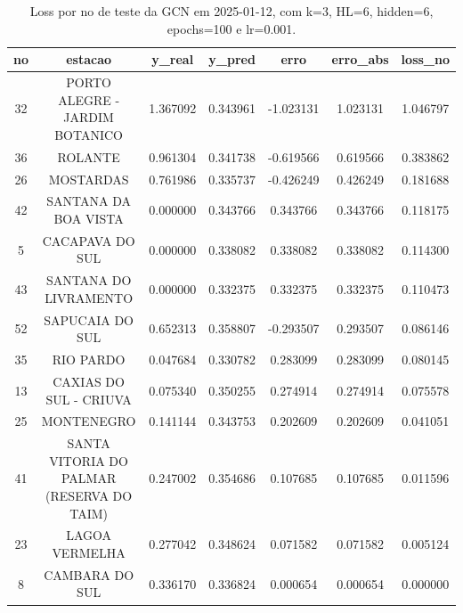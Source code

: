 \begin{table}[h]
\centering
\caption{Loss por no de teste da GCN em 2025-01-12, com k=3, HL=6, hidden=6, epochs=100 e lr=0.001.}
\label{tab:gcn_loss_k3_hl6_h6_e100_d20250112}
\begin{tabular}{ccccccc}
\toprule
no & estacao & y\_real & y\_pred & erro & erro\_abs & loss\_no \\
\midrule
32 & PORTO ALEGRE - JARDIM BOTANICO & 1.367092 & 0.343961 & -1.023131 & 1.023131 & 1.046797 \\
36 & ROLANTE & 0.961304 & 0.341738 & -0.619566 & 0.619566 & 0.383862 \\
26 & MOSTARDAS & 0.761986 & 0.335737 & -0.426249 & 0.426249 & 0.181688 \\
42 & SANTANA DA BOA VISTA & 0.000000 & 0.343766 & 0.343766 & 0.343766 & 0.118175 \\
5 & CACAPAVA DO SUL & 0.000000 & 0.338082 & 0.338082 & 0.338082 & 0.114300 \\
43 & SANTANA DO LIVRAMENTO & 0.000000 & 0.332375 & 0.332375 & 0.332375 & 0.110473 \\
52 & SAPUCAIA DO SUL & 0.652313 & 0.358807 & -0.293507 & 0.293507 & 0.086146 \\
35 & RIO PARDO & 0.047684 & 0.330782 & 0.283099 & 0.283099 & 0.080145 \\
13 & CAXIAS DO SUL - CRIUVA & 0.075340 & 0.350255 & 0.274914 & 0.274914 & 0.075578 \\
25 & MONTENEGRO & 0.141144 & 0.343753 & 0.202609 & 0.202609 & 0.041051 \\
41 & SANTA VITORIA DO PALMAR (RESERVA DO TAIM) & 0.247002 & 0.354686 & 0.107685 & 0.107685 & 0.011596 \\
23 & LAGOA VERMELHA & 0.277042 & 0.348624 & 0.071582 & 0.071582 & 0.005124 \\
8 & CAMBARA DO SUL & 0.336170 & 0.336824 & 0.000654 & 0.000654 & 0.000000 \\
\bottomrule
\end{tabular}
\end{table}
